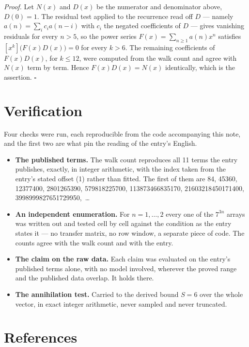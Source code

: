 \documentclass[11pt]{article}
\theoremstyle{definition}
\begin{document}
{\itshape Proof.} Let $N(x)$ and $D(x)$ be the numerator and denominator above, $D(0)=1$. The residual test applied to the recurrence read off $D$ --- namely $a(n) = \sum_i c_i a(n-i)$ with $c_i$ the negated coefficients of $D$ --- gives vanishing residuals for every $n > 5$, so the power series $F(x)=\sum_{n\ge 1}a(n)x^n$ satisfies $[x^k]\bigl(F(x)D(x)\bigr) = 0$ for every $k > 6$. The remaining coefficients of $F(x)D(x)$, for $k \le 12$, were computed from the walk count and agree with $N(x)$ term by term. Hence $F(x)D(x) = N(x)$ identically, which is the assertion. $\square$

\section{Verification}

Four checks were run, each reproducible from the code accompanying this note, and the first two are what pin the reading of the entry's English.

\begin{itemize}

\item {\bfseries The published terms.} The walk count reproduces all 11 terms the entry publishes, exactly, in integer arithmetic, with the index taken from the entry's stated offset (1) rather than fitted. The first of them are 84, 45360, 12377400, 2801265390, 579818225700, 113873466835170, 21603218450171400, 3998999827651729950,~\dots

\item {\bfseries An independent enumeration.} For $n = 1,\dots,2$ every one of the $7^{3n}$ arrays was written out and tested cell by cell against the condition as the entry states it --- no transfer matrix, no row window, a separate piece of code. The counts agree with the walk count and with the entry.

\item {\bfseries The claim on the raw data.} Each claim was evaluated on the entry's published terms alone, with no model involved, wherever the proved range and the published data overlap. It holds there.

\item {\bfseries The annihilation test.} Carried to the derived bound $S = 6$ over the whole vector, in exact integer arithmetic, never sampled and never truncated.

\end{itemize}

\section{References}
\end{document}
